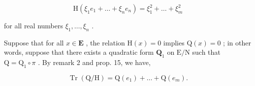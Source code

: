 \[
\mathrm{H} \left(\xi_ {1} e _ {1} + \dots + \xi_ {n} e _ {n}\right) = \xi_ {1} ^ {2} + \dots + \xi_ {m} ^ {2}\tag{46}
\]

for all real numbers \(\xi_1, \ldots, \xi_n\) .

Suppose that for all \(x \in \mathbf{E}\) , the relation \(\mathrm{H}(x) = 0\) implies \(\mathrm{Q}(x) = 0\) ; in other words, suppose that there exists a quadratic form \(\mathbf{Q}_1\) on \(\mathrm{E} / \mathrm{N}\) such that \(\mathrm{Q} = \mathrm{Q}_1 \circ \pi\) . By remark 2 and prop. 15, we have,

\[
\operatorname{Tr} (\mathrm{Q} / \mathrm{H}) = \mathrm{Q} (e _ {1}) + \dots + \mathrm{Q} (e _ {m}).\tag{47}
\]

